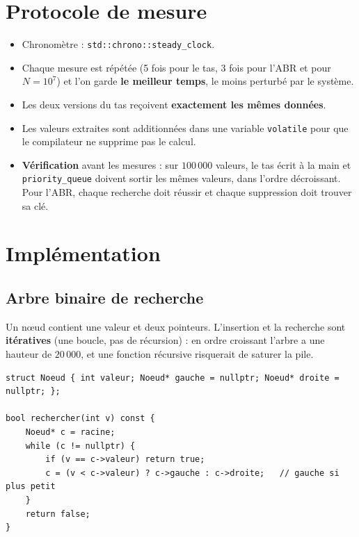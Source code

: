 \documentclass[12pt,a4paper]{report}
\begin{document}
\section{Protocole de mesure}
\begin{itemize}
  \item Chronomètre : \texttt{std::chrono::steady\_clock}.
  \item Chaque mesure est répétée (5 fois pour le tas, 3 fois pour l'ABR et pour $N=10^7$) et l'on garde \textbf{le meilleur temps}, le moins perturbé par le système.
  \item Les deux versions du tas reçoivent \textbf{exactement les mêmes données}.
  \item Les valeurs extraites sont additionnées dans une variable \texttt{volatile} pour que le compilateur ne supprime pas le calcul.
  \item \textbf{Vérification} avant les mesures : sur $100\,000$ valeurs, le tas écrit à la main et \texttt{priority\_queue} doivent sortir les mêmes valeurs, dans l'ordre décroissant. Pour l'ABR, chaque recherche doit réussir et chaque suppression doit trouver sa clé.
\end{itemize}

\section{Implémentation}

\subsection{Arbre binaire de recherche}
Un nœud contient une valeur et deux pointeurs. L'insertion et la recherche sont \textbf{itératives} (une boucle, pas de récursion) : en ordre croissant l'arbre a une hauteur de $20\,000$, et une fonction récursive risquerait de saturer la pile.
\begin{lstlisting}
struct Noeud { int valeur; Noeud* gauche = nullptr; Noeud* droite = nullptr; };

bool rechercher(int v) const {
    Noeud* c = racine;
    while (c != nullptr) {
        if (v == c->valeur) return true;
        c = (v < c->valeur) ? c->gauche : c->droite;   // gauche si plus petit
    }
    return false;
}
\end{lstlisting}
\end{document}
